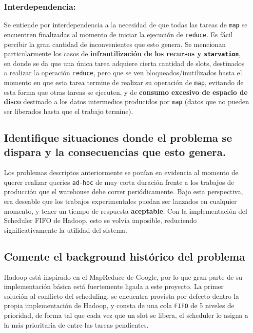 \documentclass[11pt, a4paper, twoside]{article}
\begin{document}
\subsubsection{Interdependencia:}

Se entiende por interdependencia a la necesidad de que todas las tareas de
\texttt{map} se encuentren finalizadas al momento de iniciar la ejecución de
\texttt{reduce}. Es fácil percibir la gran cantidad de inconvenientes que esto
genera. Se mencionan particularmente los casos de \textbf{infrautilización de
los recursos y \texttt{starvation}}, en donde se da que una única tarea adquiere
cierta cantidad de slots, destinados a realizar la operación \texttt{reduce},
pero que se ven bloqueados/inutilizados hasta el momento en que esta tarea
termine de realizar su operación de \texttt{map}, evitando de esta forma que
otras tareas se ejecuten, y de \textbf{consumo excesivo de espacio de disco}
destinado a los datos intermedios producidos por \texttt{map} (datos que no
pueden ser liberados hasta que el trabajo termine).

\clearpage
\subsection {\footnotesize Identifique situaciones donde el problema se dispara y la consecuencias que esto genera.}
\label{investigacion-3}

Los problemas descriptos anteriormente se ponían en evidencia al momento de
querer realizar queries \texttt{ad-hoc} de muy corta duración frente a los
trabajos de producción que el warehouse debe correr periódicamente. Bajo esta
perspectiva, era deseable que los trabajos experimentales puedan ser lanzados
en cualquier momento, y tener un tiempo de respuesta \textbf{aceptable}. Con
la implementación del Scheduler FIFO de Hadoop, esto se volvía imposible,
reduciendo significativamente la utilidad del sistema.

\clearpage

\subsection {\footnotesize Comente el background histórico del problema}
\label{investigacion-4}
Hadoop está inspirado en el MapReduce de Google, por lo que gran parte de su
implementación básica está fuertemente ligada a este proyecto. La primer
solución al conflicto del scheduling, se encuentra provista por defecto dentro
la propia implementación de Hadoop, y consta de una cola \texttt{FIFO} de 5
niveles de prioridad, de forma tal que cada vez que un slot se libera, el
scheduler lo asigna a la más prioritaria de entre las tareas pendientes.
\end{document}
